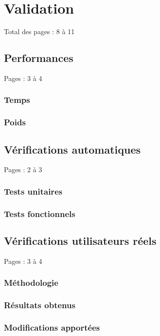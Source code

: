 \documentclass{EPL-master-thesis-covers-FR}
\begin{document}
	\chapter{Validation}

		Total des pages : 8 à 11

		\section{Performances}

			Pages : 3 à 4

			\subsection*{Temps}
			\subsection*{Poids}

		\section{Vérifications automatiques}

			Pages : 2 à 3

			\subsection*{Tests unitaires}
			\subsection*{Tests fonctionnels}

		\section{Vérifications utilisateurs réels}

			Pages : 3 à 4

			\subsection*{Méthodologie}
			\subsection*{Résultats obtenus}
			\subsection*{Modifications apportées}
\end{document}
